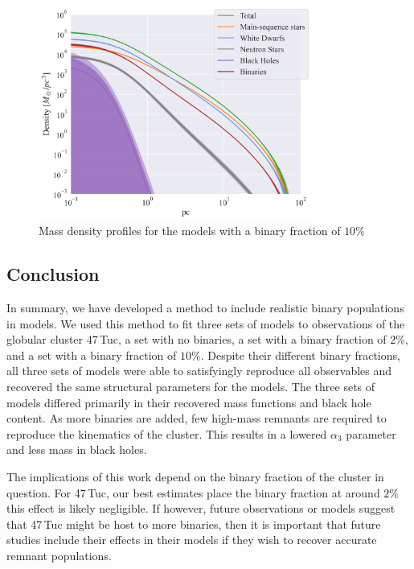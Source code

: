 \begin{figure}
	\centering
	\includegraphics[width=0.8\textwidth]{figures/high_bin_model/density.png}
	\caption{Mass density profiles for the models with a binary fraction of $10\%$}
	\label{fig:highbin_model_densities}
\end{figure}



\subsection{Conclusion}


In summary, we have developed a method to include realistic binary populations in 
models. We used this method to fit three sets of models to observations of the globular cluster
47\,Tuc, a set with no binaries, a set with a binary fraction of $2\%$, and a set with a binary
fraction of $10\%$. Despite their different binary fractions, all three sets of models were able
to satisfyingly reproduce all observables and recovered the same structural parameters for the
models. The three sets of models differed primarily in their recovered mass functions and black hole
content. As more binaries are added, few high-mass remnants are required to reproduce the kinematics
of the cluster. This results in a lowered $\alpha_3$ parameter and less mass in black holes.

The implications of this work depend on the binary fraction of the cluster in question. For 47\,Tuc,
our best estimates place the binary fraction at around $2\%$ this effect is likely negligible. If
however, future observations or models suggest that 47\,Tuc might be host to more binaries, then it
is important that future studies include their effects in their models if they wish to recover
accurate remnant populations. 


